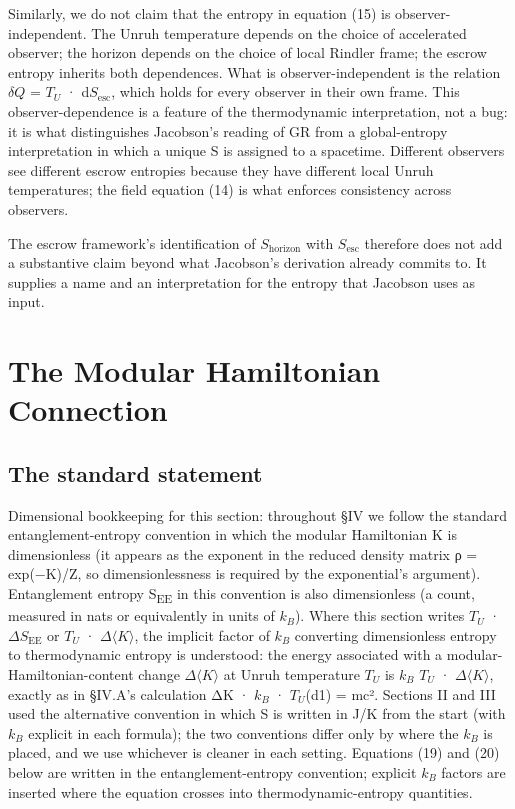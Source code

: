 \documentclass[11pt]{article}
\begin{document}
Similarly, we do not claim that the entropy in equation (15) is
observer-independent. The Unruh temperature depends on the choice of
accelerated observer; the horizon depends on the choice of local Rindler
frame; the escrow entropy inherits both dependences. What is
observer-independent is the relation $\delta Q$ = $T_{U}$ · d$S_{\mathrm{esc}}$, which holds for
every observer in their own frame. This observer-dependence is a feature
of the thermodynamic interpretation, not a bug: it is what distinguishes
Jacobson's reading of GR from a global-entropy interpretation in which
a unique S is assigned to a spacetime. Different observers see different
escrow entropies because they have different local Unruh temperatures;
the field equation (14) is what enforces consistency across observers.

The escrow framework's identification of $S_{\mathrm{horizon}}$ with $S_{\mathrm{esc}}$ therefore
does not add a substantive claim beyond what Jacobson's derivation
already commits to. It supplies a name and an interpretation for the
entropy that Jacobson uses as input.


\section{The Modular Hamiltonian Connection}


\subsection{The standard statement}

Dimensional bookkeeping for this section: throughout §IV we follow the
standard entanglement-entropy convention in which the modular
Hamiltonian K is dimensionless (it appears as the exponent in the
reduced density matrix ρ = exp(−K)/Z, so dimensionlessness is required
by the exponential's argument). Entanglement entropy S\textsubscript{EE} in this
convention is also dimensionless (a count, measured in nats or
equivalently in units of $k_{B}$). Where this section writes $T_{U}$ · $\Delta S_{\mathrm{EE}}$ or
$T_{U}$ · $\Delta\langle K\rangle$, the implicit factor of $k_{B}$ converting dimensionless entropy
to thermodynamic entropy is understood: the energy associated with a
modular-Hamiltonian-content change $\Delta\langle K\rangle$ at Unruh temperature $T_{U}$ is $k_{B}$
$T_{U}$ · $\Delta\langle K\rangle$, exactly as in §IV.A's calculation ΔK · $k_{B}$ · $T_{U}$(d1) = mc².
Sections II and III used the alternative convention in which S is
written in J/K from the start (with $k_{B}$ explicit in each formula); the
two conventions differ only by where the $k_{B}$ is placed, and we use
whichever is cleaner in each setting. Equations (19) and (20) below are
written in the entanglement-entropy convention; explicit $k_{B}$ factors are
inserted where the equation crosses into thermodynamic-entropy
quantities.
\end{document}
